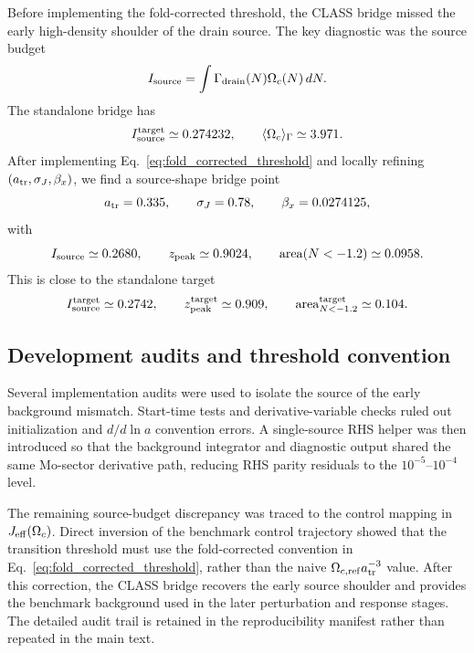 ﻿\documentclass[11pt,prd,preprint,nofootinbib,amsmath,amssymb]{revtex4-2}
\begin{document}
Before implementing the fold-corrected threshold, the CLASS bridge missed the early high-density shoulder of the drain source. The key diagnostic was the source budget
\begin{equation}
I_{\rm source}
=
\int \Gamma_{\rm drain}(N)\Omega_c(N)\,dN.
\end{equation}
The standalone bridge has
\begin{equation}
I_{\rm source}^{\rm target}\simeq0.274232,
\qquad
\langle\Omega_c\rangle_\Gamma\simeq3.971.
\end{equation}
After implementing Eq.~\eqref{eq:fold_corrected_threshold} and locally refining $(a_{\rm tr},\sigma_J,\beta_x)$, we find a source-shape bridge point
\begin{equation}
a_{\rm tr}=0.335,
\qquad
\sigma_J=0.78,
\qquad
\beta_x=0.0274125,
\end{equation}
with
\begin{equation}
I_{\rm source}\simeq0.2680,
\qquad
z_{\rm peak}\simeq0.9024,
\qquad
{\rm area}(N<-1.2)\simeq0.0958.
\end{equation}
This is close to the standalone target
\begin{equation}
I_{\rm source}^{\rm target}\simeq0.2742,
\qquad
z_{\rm peak}^{\rm target}\simeq0.909,
\qquad
{\rm area}_{N<-1.2}^{\rm target}\simeq0.104.
\end{equation}

\subsection{Development audits and threshold convention}

Several implementation audits were used to isolate the source of the early
background mismatch. Start-time tests and derivative-variable checks ruled out
initialization and $d/d\ln a$ convention errors. A single-source RHS helper was
then introduced so that the background integrator and diagnostic output shared
the same Mo-sector derivative path, reducing RHS parity residuals to the
$10^{-5}$--$10^{-4}$ level.

The remaining source-budget discrepancy was traced to the control mapping in
$J_{\rm eff}(\Omega_c)$. Direct inversion of the benchmark control trajectory
showed that the transition threshold must use the fold-corrected convention in
Eq.~\eqref{eq:fold_corrected_threshold}, rather than the naive
$\Omega_{c,\rm ref}a_{\rm tr}^{-3}$ value. After this correction, the CLASS
bridge recovers the early source shoulder and provides the benchmark
background used in the later perturbation and response stages. The detailed
audit trail is retained in the reproducibility manifest rather than repeated
in the main text.
\end{document}
